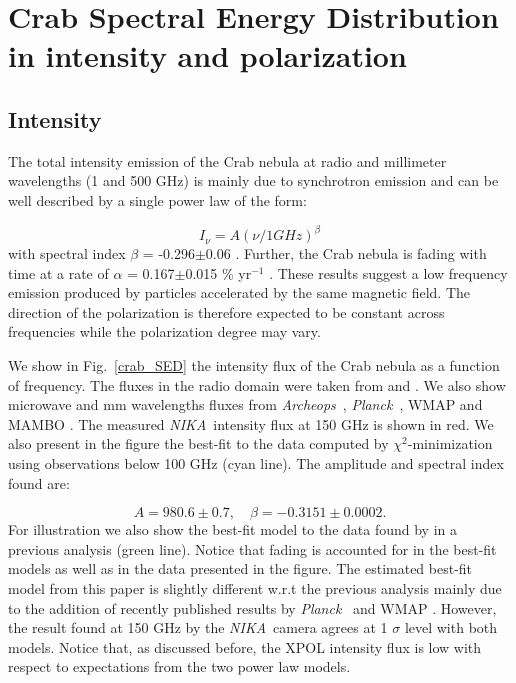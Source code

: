 \documentclass[twocolumn,traditabstract]{aa}
\def\NIKA{\textit{NIKA}}
\def\Archeops{\textit{Archeops}}
\def\Planck{\textit{Planck}}
\begin{document}
\section{Crab Spectral Energy Distribution in intensity and polarization}\label{sec:Polarization intensity Spectral Energy Density (SED)}
\subsection{Intensity}
The total intensity emission of the Crab nebula at radio and millimeter wavelengths (1 and 500 GHz) is mainly due to synchrotron emission and can be well described by a single power law of the form:

\begin{equation}
I_{\nu} = A(\nu / 1 GHz)^{\beta}
\end{equation}\label{eq:sync}
with spectral index $\beta$ = -0.296$\pm$0.06 \citep{baars1977absolute,macias2010}. Further, the Crab nebula is fading with time at a rate of $\alpha$ = 0.167$\pm$0.015 \% yr$^{-1}$ \citep{aller1985decrease}. 
These results suggest a low frequency emission produced by particles accelerated by the same magnetic field. The direction of the polarization is therefore expected to be constant across frequencies while the polarization degree may vary. 

We show in Fig.~\ref{crab_SED} the intensity flux of the Crab nebula as a function of frequency. The fluxes in the radio domain were taken from \cite{dmitrenko1970absolute} and \cite{1971IzVUZ..14..157V}. We also show microwave and mm wavelengths fluxes from \Archeops\ \citep{macias2007archeops}, \Planck\ \citep{2015arXiv150702058P}, WMAP \citep{2011ApJS..192...19W} and MAMBO \citep{2002A&A...386.1044B}. The measured \NIKA\ intensity flux at 150 GHz is shown in red.
We also present in the figure the best-fit to the data computed by $\chi^2$-minimization using observations below 100 GHz (cyan line). The amplitude and spectral index found are: 

\begin{equation}
 A = 980.6 \pm 0.7  ,\quad \beta = -0.3151 \pm 0.0002. 
 \end{equation}
 For illustration we also show the best-fit model to the data found by \cite{macias2010} in a previous analysis (green line). 
Notice that fading is accounted for in the best-fit models as well as in the data presented in the figure.
The estimated best-fit model from this paper is slightly different w.r.t the previous analysis mainly due to the addition of recently published results by \Planck\ \citep{2015arXiv150702058P} and  WMAP \citep{2011ApJS..192...19W}. However, the result found at 150 GHz by the \NIKA\ camera agrees at 1 $\sigma$ level with both models. 
Notice that, as discussed before, the XPOL intensity flux is low with respect to expectations from the two power law models. 
 
\end{document}
